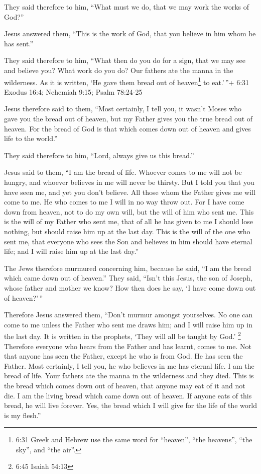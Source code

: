  They said therefore to him, ``What must we do, that we may
work the works of God?''

 Jesus answered them, ``This is the work of God, that you
believe in him whom he has sent.''

 They said therefore to him, ``What then do you do for a
sign, that we may see and believe you? What work do you do?
 Our fathers ate the manna in the wilderness. As it is
written, `He gave them bread out of heaven\footnote{6:31 Greek and
  Hebrew use the same word for ``heaven'', ``the heavens'', ``the sky'',
  and ``the air''.} to eat.'\,''+ 6:31 Exodus 16:4; Nehemiah 9:15; Psalm
78:24-25

 Jesus therefore said to them, ``Most certainly, I tell
you, it wasn't Moses who gave you the bread out of heaven, but my Father
gives you the true bread out of heaven.  For the bread of
God is that which comes down out of heaven and gives life to the
world.''

 They said therefore to him, ``Lord, always give us this
bread.''

 Jesus said to them, ``I am the bread of life. Whoever
comes to me will not be hungry, and whoever believes in me will never be
thirsty.  But I told you that you have seen me, and yet you
don't believe.  All those whom the Father gives me will
come to me. He who comes to me I will in no way throw out. 
For I have come down from heaven, not to do my own will, but the will of
him who sent me.  This is the will of my Father who sent
me, that of all he has given to me I should lose nothing, but should
raise him up at the last day.  This is the will of the one
who sent me, that everyone who sees the Son and believes in him should
have eternal life; and I will raise him up at the last day.''

 The Jews therefore murmured concerning him, because he
said, ``I am the bread which came down out of heaven.'' 
They said, ``Isn't this Jesus, the son of Joseph, whose father and
mother we know? How then does he say, `I have come down out of
heaven?'\,''

 Therefore Jesus answered them, ``Don't murmur amongst
yourselves.  No one can come to me unless the Father who
sent me draws him; and I will raise him up in the last day.
 It is written in the prophets, `They will all be taught by
God.' \footnote{6:45 Isaiah 54:13} Therefore everyone who hears from the
Father and has learnt, comes to me.  Not that anyone has
seen the Father, except he who is from God. He has seen the Father.
 Most certainly, I tell you, he who believes in me has
eternal life.  I am the bread of life.  Your
fathers ate the manna in the wilderness and they died. 
This is the bread which comes down out of heaven, that anyone may eat of
it and not die.  I am the living bread which came down out
of heaven. If anyone eats of this bread, he will live forever. Yes, the
bread which I will give for the life of the world is my flesh.''

